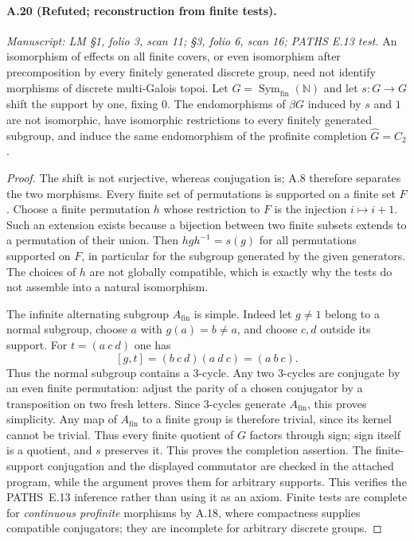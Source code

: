 \paragraph{A.20 (Refuted; reconstruction from finite tests).}
\textit{Manuscript: LM \S1, folio 3, scan 11; \S3, folio 6, scan 16; PATHS E.13 test.}
An isomorphism of effects on all finite covers, or even isomorphism after precomposition by every finitely generated discrete group, need not identify morphisms of discrete multi-Galois topoi. Let $G=\operatorname{Sym}_{\mathrm{fin}}(\mathbb N)$ and let $s:G\to G$ shift the support by one, fixing $0$. The endomorphisms of $\beta G$ induced by $s$ and $1$ are not isomorphic, have isomorphic restrictions to every finitely generated subgroup, and induce the same endomorphism of the profinite completion $\widehat G=C_2$.
\begin{proof}
The shift is not surjective, whereas conjugation is; A.8 therefore separates the two morphisms. Every finite set of permutations is supported on a finite set $F$. Choose a finite permutation $h$ whose restriction to $F$ is the injection $i\mapsto i+1$. Such an extension exists because a bijection between two finite subsets extends to a permutation of their union. Then $hgh^{-1}=s(g)$ for all permutations supported on $F$, in particular for the subgroup generated by the given generators. The choices of $h$ are not globally compatible, which is exactly why the tests do not assemble into a natural isomorphism.

The infinite alternating subgroup $A_{\mathrm{fin}}$ is simple. Indeed let $g\ne1$ belong to a normal subgroup, choose $a$ with $g(a)=b\ne a$, and choose $c,d$ outside its support. For $t=(a\ c\ d)$ one has
\[
 [g,t]=(b\ c\ d)(a\ d\ c)=(a\ b\ c).
\]
Thus the normal subgroup contains a $3$-cycle. Any two $3$-cycles are conjugate by an even finite permutation: adjust the parity of a chosen conjugator by a transposition on two fresh letters. Since $3$-cycles generate $A_{\mathrm{fin}}$, this proves simplicity. Any map of $A_{\mathrm{fin}}$ to a finite group is therefore trivial, since its kernel cannot be trivial. Thus every finite quotient of $G$ factors through sign; sign itself is a quotient, and $s$ preserves it. This proves the completion assertion. The finite-support conjugation and the displayed commutator are checked in the attached program, while the argument proves them for arbitrary supports. This verifies the PATHS~E.13 inference rather than using it as an axiom. Finite tests are complete for \emph{continuous profinite} morphisms by A.18, where compactness supplies compatible conjugators; they are incomplete for arbitrary discrete groups. 
\end{proof}

